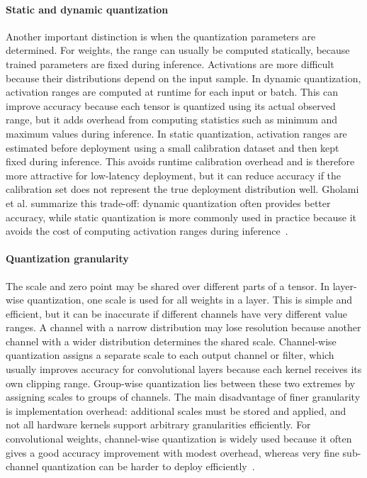 \documentclass[12pt,a4paper]{report}
\begin{document}
\paragraph{Static and dynamic quantization}
Another important distinction is when the quantization parameters are determined. For weights,
the range can usually be computed statically, because trained parameters are fixed during
inference. Activations are more difficult because their distributions depend on the input sample.
In dynamic quantization, activation ranges are computed at runtime for each input or batch.
This can improve accuracy because each tensor is quantized using its actual observed range, but
it adds overhead from computing statistics such as minimum and maximum values during
inference. In static quantization, activation ranges are estimated before deployment using a
small calibration dataset and then kept fixed during inference. This avoids runtime calibration
overhead and is therefore more attractive for low-latency deployment, but it can reduce accuracy
if the calibration set does not represent the true deployment distribution well. Gholami et al.
summarize this trade-off: dynamic quantization often provides better accuracy, while static
quantization is more commonly used in practice because it avoids the cost of computing activation
ranges during inference~\cite{gholami2022survey}.

\paragraph{Quantization granularity}
The scale and zero point may be shared over different parts of a tensor. In layer-wise
quantization, one scale is used for all weights in a layer. This is simple and efficient, but it can be
inaccurate if different channels have very different value ranges. A channel with a narrow
distribution may lose resolution because another channel with a wider distribution determines the
shared scale. Channel-wise quantization assigns a separate scale to each output channel or filter,
which usually improves accuracy for convolutional layers because each kernel receives its own
clipping range. Group-wise quantization lies between these two extremes by assigning scales to
groups of channels. The main disadvantage of finer granularity is implementation overhead:
additional scales must be stored and applied, and not all hardware kernels support arbitrary
granularities efficiently. For convolutional weights, channel-wise quantization is widely used
because it often gives a good accuracy improvement with modest overhead, whereas very fine
sub-channel quantization can be harder to deploy efficiently~\cite{gholami2022survey}.
\end{document}
